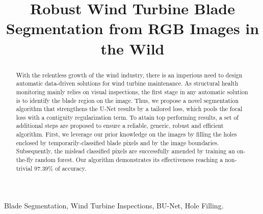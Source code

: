 \documentclass{article}
\title{Robust Wind Turbine Blade Segmentation from RGB Images in the Wild}
\begin{document}
%
\maketitle
%
\begin{abstract}
With the relentless growth of the wind industry, there is an imperious need to design automatic data-driven solutions for wind turbine maintenance. As structural health monitoring mainly relies on visual inspections, the first stage in any automatic solution is to identify the blade region on the image. Thus, we propose a novel segmentation algorithm that strengthens the U-Net results by a tailored loss, which pools the focal loss with a contiguity regularization term. To attain top performing results, a set of additional steps are proposed to ensure a reliable, generic, robust and efficient algorithm. First, we leverage our prior knowledge on the images by filling the holes enclosed by temporarily-classified blade pixels and by the image boundaries. Subsequently, the mislead classified pixels are successfully amended by training an on-the-fly random forest. Our algorithm demonstrates its effectiveness reaching a non-trivial 97.39\% of accuracy. %
\end{abstract}
%
\begin{keywords}
Blade Segmentation, Wind Turbine Inspections, BU-Net, Hole Filling. %
\end{keywords}
%


%








\vfill\pagebreak





\end{document}
